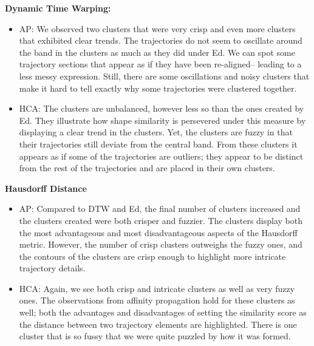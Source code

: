 \textbf{Dynamic Time Warping:}
\begin{itemize}
\item AP: We observed two clusters that were very crisp and even more clusters that exhibited clear trends. 
The trajectories do not seem to oscillate around the band in the clusters as much as they did under Ed. 
We can spot some trajectory sections that appear as if they have been re-aligned– leading to a less messy expression. 
Still, there are some oscillations and noisy clusters that make it hard to tell exactly why some trajectories were clustered together. 
\medskip  
\clearpage
\item HCA: The clusters are unbalanced, however less so than the ones created by Ed. 
They illustrate how shape similarity is persevered under this measure by displaying a clear trend in the clusters. 
Yet, the clusters are fuzzy in that their trajectories still deviate from the central band. 
From these clusters it appears as if some of the trajectories are outliers; 
they appear to be distinct from the rest of the trajectories and are placed in their own clusters. 
\end{itemize}


\textbf{Hausdorff Distance}
\begin{itemize}

\item AP: Compared to DTW and Ed, the final number of clusters increased and the clusters created were both crisper and fuzzier. 
The clusters display both the most advantageous and most disadvantageous aspects of the Hausdorff metric. 
However, the number of crisp clusters outweighs the fuzzy ones, and the contours of the clusters are crisp enough to highlight more intricate trajectory details. 

\medskip
\item HCA: Again, we see both crisp and intricate clusters as well as very fuzzy ones. 
The observations from affinity propagation hold for these clusters as well; 
both the advantages and disadvantages of setting the similarity score as the distance between two trajectory elements are highlighted. 
There is one cluster that is so fussy that we were quite puzzled by how it was formed.
\end{itemize}


